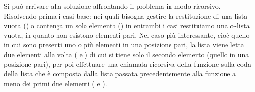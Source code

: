 Si può arrivare alla soluzione affrontando il problema in modo ricorsivo. %
Risolvendo prima i casi base: nei quali bisogna gestire la {\greenHL restituzione di una lista vuota} (\sml{[]}) o contenga un solo elemento (\sml{[v]}) in entrambi i casi restituiamo una \(\alpha\)-lista vuota, in quanto non esistono elementi pari.
Nel caso più interessante, cioè quello in cui sono presenti uno o più elementi in una posizione pari, {\yellowHL la lista viene letta due elementi alla volta ( e ) di cui si tiene solo il secondo elemento} (quello in una posizione pari), per poi effettuare una {\orangeHL chiamata ricorsiva della funzione sulla coda della lista} che è composta dalla lista passata precedentemente alla funzione a meno dei primi due elementi ( e ).
